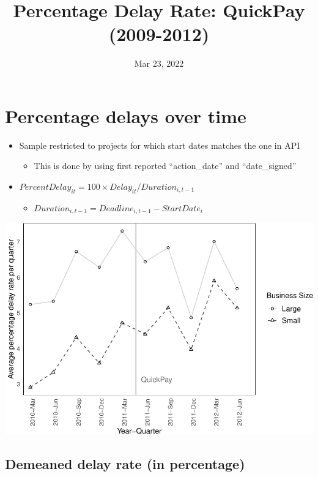 \documentclass[
]{article}
\title{Percentage Delay Rate: QuickPay (2009-2012)}
\author{}
\date{\vspace{-2.5em}Mar 23, 2022}
\providecommand{\tightlist}{%
  \setlength{\itemsep}{0pt}\setlength{\parskip}{0pt}}
\begin{document}
\maketitle

\hypertarget{percentage-delays-over-time}{%
\section{Percentage delays over
time}\label{percentage-delays-over-time}}

\begin{itemize}
\tightlist
\item
  Sample restricted to projects for which start dates matches the one in
  API

  \begin{itemize}
  \tightlist
  \item
    This is done by using first reported ``action\_date'' and
    ``date\_signed''
  \end{itemize}
\item
  \(PercentDelay_{it}=100 \times Delay_{it}/Duration_{i,t-1}\)

  \begin{itemize}
  \tightlist
  \item
    \(Duration_{i,t-1} = Deadline_{i,t-1} - StartDate_i\)
  \end{itemize}
\end{itemize}

\includegraphics{qp_first_pc_delay-2_files/figure-latex/plot_pc_delay-1.pdf}

\hypertarget{demeaned-delay-rate-in-percentage}{%
\subsection{Demeaned delay rate (in
percentage)}\label{demeaned-delay-rate-in-percentage}}
\end{document}
